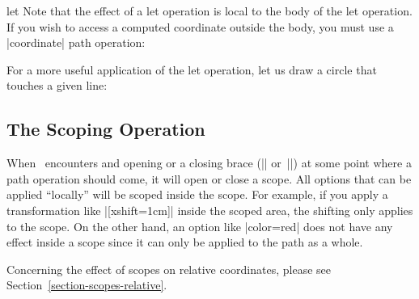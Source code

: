 \begin{pathoperation}{let}{
        }
    Note that the effect of a let operation is local to the body of the let
    operation. If you wish to access a computed coordinate outside the body,
    you must use a |coordinate| path operation:
\begin{codeexample}[]
\end{codeexample}

    For a more useful application of the let operation, let us draw a circle
    that touches a given line:
\begin{codeexample}[]
\end{codeexample}
\end{pathoperation}


\subsection{The Scoping Operation}

When \tikzname\ encounters and opening or a closing brace (|{| or~|}|) at some
point where a path operation should come, it will open or close a scope. All
options that can be applied ``locally'' will be scoped inside the scope. For
example, if you apply a transformation like |[xshift=1cm]| inside the scoped
area, the shifting only applies to the scope. On the other hand, an option like
|color=red| does not have any effect inside a scope since it can only be
applied to the path as a whole.

Concerning the effect of scopes on relative coordinates, please see
Section~\ref{section-scopes-relative}.


